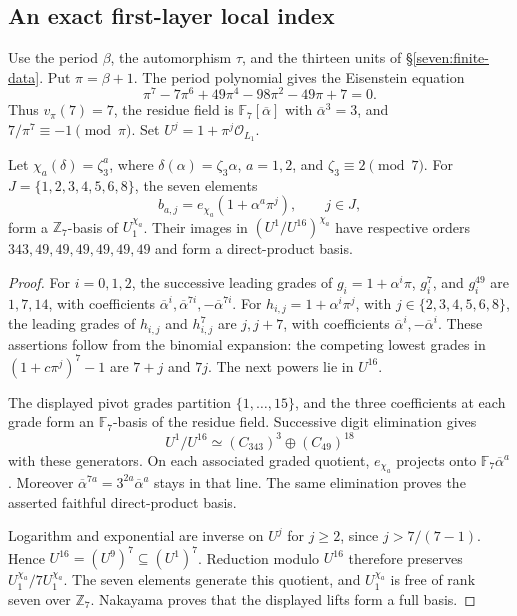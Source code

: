 \subsection{An exact first-layer local index}

Use the period $\beta$, the automorphism $\tau$, and the thirteen
units of \S\ref{seven:finite-data}. Put $\pi=\beta+1$. The period
polynomial gives the Eisenstein equation
\begin{equation*}\tag{U11}\label{seven:local-eisenstein}
 \pi^7-7\pi^6+49\pi^4-98\pi^2-49\pi+7=0.
\end{equation*}
Thus $v_\pi(7)=7$, the residue field is
$\mathbb F_7[\overline\alpha]$ with $\overline\alpha^3=3$, and
$7/\pi^7\equiv-1\pmod\pi$. Set $U^j=1+\pi^j\mathcal O_{L_1}$.

\begin{lemma}\label{seven:local-finite-basis}
Let $\chi_a(\delta)=\zeta_3^a$, where
$\delta(\alpha)=\zeta_3\alpha$, $a=1,2$, and
$\zeta_3\equiv2\pmod7$. For
$J=\{1,2,3,4,5,6,8\}$, the seven elements
\[
 b_{a,j}=e_{\chi_a}(1+\alpha^a\pi^j),\qquad j\in J,
\]
form a $\mathbb Z_7$-basis of $U_1^{\chi_a}$.
Their images in $(U^1/U^{16})^{\chi_a}$ have respective orders
$343,49,49,49,49,49,49$ and form a direct-product basis.
\end{lemma}

\begin{proof}
For $i=0,1,2$, the successive leading grades of
$g_i=1+\alpha^i\pi$, $g_i^7$, and $g_i^{49}$ are $1,7,14$,
with coefficients
$\overline\alpha^i,\overline\alpha^{7i},-\overline\alpha^{7i}$.
For $h_{i,j}=1+\alpha^i\pi^j$, with
$j\in\{2,3,4,5,6,8\}$, the leading grades of $h_{i,j}$ and
$h_{i,j}^7$ are $j,j+7$, with coefficients
$\overline\alpha^i,-\overline\alpha^i$.
These assertions follow from the binomial expansion: the competing
lowest grades in $(1+c\pi^j)^7-1$ are $7+j$ and $7j$.
The next powers lie in $U^{16}$.

The displayed pivot grades partition $\{1,\ldots,15\}$, and the three
coefficients at each grade form an $\mathbb F_7$-basis of the residue
field. Successive digit elimination gives
\[
 U^1/U^{16}\simeq(C_{343})^3\oplus(C_{49})^{18}
\]
with these generators. On each associated graded quotient,
$e_{\chi_a}$ projects onto
$\mathbb F_7\overline\alpha^a$.
Moreover
$\overline\alpha^{7a}=3^{2a}\overline\alpha^a$ stays in that line.
The same elimination proves the asserted faithful direct-product
basis.

Logarithm and exponential are inverse on $U^j$ for $j\ge2$, since
$j>7/(7-1)$. Hence
$U^{16}=(U^9)^7\subseteq(U^1)^7$.
Reduction modulo $U^{16}$ therefore preserves
$U_1^{\chi_a}/7U_1^{\chi_a}$. The seven elements generate this quotient,
and $U_1^{\chi_a}$ is free of rank seven over $\mathbb Z_7$.
Nakayama proves that the displayed lifts form a full basis.
\end{proof}

